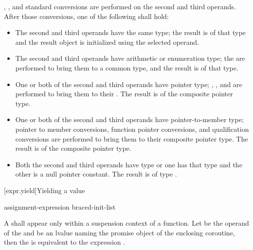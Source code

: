 \pnum
{}, ,
and  standard conversions are
performed on the second and third operands. After those conversions, one
of the following shall hold:
\begin{itemize}
\item The second and third operands have the same type; the result is of
that type and the result object is initialized using the selected operand.

\item The second and third operands have arithmetic or enumeration type;
the  are performed to bring them to a common
type, and the result is of that type.

\item One or both of the second and third operands have pointer type;
,
, and
are performed to bring them to their
. The result is of the composite
pointer type.

\item One or both of the second and third operands have pointer-to-member type;
pointer to member conversions,
function pointer conversions, and
qualification conversions
are performed to bring them to their composite
pointer type. The result is of the composite pointer type.

\item
Both the second and third operands have type  or one has
that type and the other is a null pointer constant. The result is of type
.
\end{itemize}

[expr.yield]{Yielding a value}%
%
%

\begin{bnf}
  \br
   assignment-expression\br
   braced-init-list
\end{bnf}

\pnum
A  shall appear only within a suspension context
of a function.
Let  be the operand of the  and
 be an lvalue naming the promise object of the enclosing
coroutine, then the 
is equivalent to the expression
.

